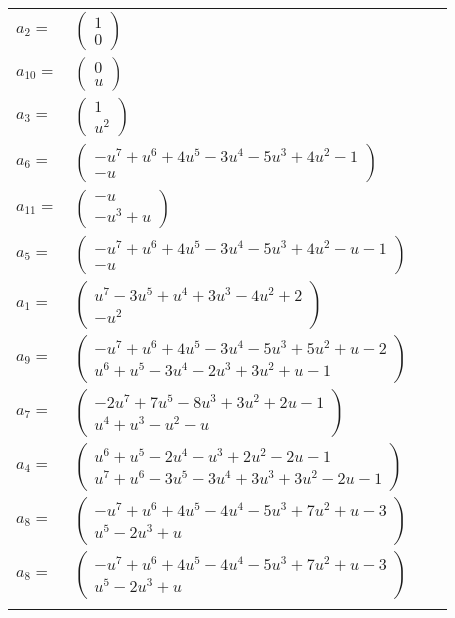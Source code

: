 \documentclass[1p]{elsarticle_modified}
\theoremstyle{definition}
\begin{document}
\begin{tabular}{m{7pt} m{180pt} m{7pt} m{180pt} }
\flushright $a_{2}=$&$\begin{pmatrix}1\\0\end{pmatrix}$ \\
\flushright $a_{10}=$&$\begin{pmatrix}0\\u\end{pmatrix}$ \\
\flushright $a_{3}=$&$\begin{pmatrix}1\\u^2\end{pmatrix}$ \\
\flushright $a_{6}=$&$\begin{pmatrix}- u^7+u^6+4 u^5-3 u^4-5 u^3+4 u^2-1\\- u\end{pmatrix}$ \\
\flushright $a_{11}=$&$\begin{pmatrix}- u\\- u^3+u\end{pmatrix}$ \\
\flushright $a_{5}=$&$\begin{pmatrix}- u^7+u^6+4 u^5-3 u^4-5 u^3+4 u^2- u-1\\- u\end{pmatrix}$ \\
\flushright $a_{1}=$&$\begin{pmatrix}u^7-3 u^5+u^4+3 u^3-4 u^2+2\\- u^2\end{pmatrix}$ \\
\flushright $a_{9}=$&$\begin{pmatrix}- u^7+u^6+4 u^5-3 u^4-5 u^3+5 u^2+u-2\\u^6+u^5-3 u^4-2 u^3+3 u^2+u-1\end{pmatrix}$ \\
\flushright $a_{7}=$&$\begin{pmatrix}-2 u^7+7 u^5-8 u^3+3 u^2+2 u-1\\u^4+u^3- u^2- u\end{pmatrix}$ \\
\flushright $a_{4}=$&$\begin{pmatrix}u^6+u^5-2 u^4- u^3+2 u^2-2 u-1\\u^7+u^6-3 u^5-3 u^4+3 u^3+3 u^2-2 u-1\end{pmatrix}$ \\
\flushright $a_{8}=$&$\begin{pmatrix}- u^7+u^6+4 u^5-4 u^4-5 u^3+7 u^2+u-3\\u^5-2 u^3+u\end{pmatrix}$\\ \flushright $a_{8}=$&$\begin{pmatrix}- u^7+u^6+4 u^5-4 u^4-5 u^3+7 u^2+u-3\\u^5-2 u^3+u\end{pmatrix}$\\&\end{tabular}
\end{document}
